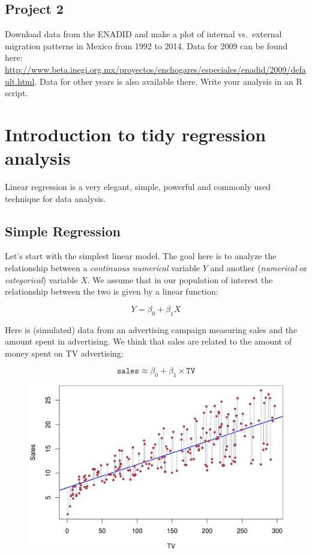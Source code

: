 \documentclass[]{book}
\theoremstyle{definition}
\theoremstyle{definition}
\theoremstyle{remark}
\begin{document}
\section{Project 2}\label{project-2}

Download data from the ENADID and make a plot of internal vs.~external
migration patterns in Mexico from 1992 to 2014. Data for 2009 can be
found here:
\url{http://www.beta.inegi.org.mx/proyectos/enchogares/especiales/enadid/2009/default.html}.
Data for other years is also available there. Write your analysis in an
R script.

\chapter{Introduction to tidy regression
analysis}\label{introduction-to-tidy-regression-analysis}

Linear regression is a very elegant, simple, powerful and commonly used
technique for data analysis.

\section{Simple Regression}\label{simple-regression}

Let's start with the simplest linear model. The goal here is to analyze
the relationship between a \emph{continuous numerical} variable \(Y\)
and another (\emph{numerical} or \emph{categorical}) variable \(X\). We
assume that in our population of interest the relationship between the
two is given by a linear function:

\[
Y = \beta_0 + \beta_1 X
\]

Here is (simulated) data from an advertising campaign measuring sales
and the amount spent in advertising. We think that sales are related to
the amount of money spent on TV advertising:

\[
\mathtt{sales} \approx \beta_0 + \beta_1 \times \mathtt{TV}
\]

\begin{figure}
\centering
\includegraphics{img/regression_example.png}
\caption{}
\end{figure}
\end{document}
